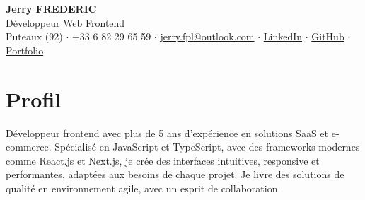 \documentclass[9pt,a4paper]{extarticle}
\begin{document}
\begin{center}
  {\LARGE\bfseries Jerry FREDERIC}\\[0.15em]
  {\large\color{accent} Développeur Web Frontend}\\[0.15em]
  {\footnotesize Puteaux (92) \quad $\cdot$ \quad +33 6 82 29 65 59 \quad $\cdot$ \quad
  \href{mailto:jerry.fpl@outlook.com}{jerry.fpl@outlook.com} \quad $\cdot$ \quad
  \href{https://www.linkedin.com/in/jerry-frederic/}{LinkedIn} \quad $\cdot$ \quad
  \href{https://github.com/thateflondon}{GitHub} \quad $\cdot$ \quad
  \href{https://www.jfpl.fr/}{Portfolio}}
\end{center}

\vspace{0.3em}
\section{Profil}
Développeur frontend avec plus de 5 ans d'expérience en solutions SaaS et e-commerce. Spécialisé en JavaScript et TypeScript, avec des frameworks modernes comme React.js et Next.js, je crée des interfaces intuitives, responsive et performantes, adaptées aux besoins de chaque projet. Je livre des solutions de qualité en environnement agile, avec un esprit de collaboration.

\vspace{0.5em}
\end{document}
